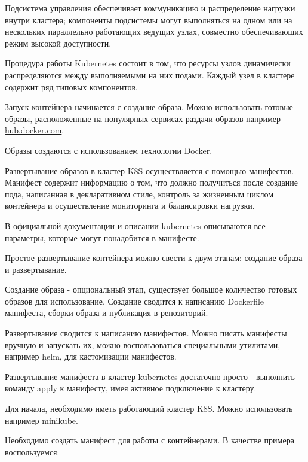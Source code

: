 Подсистема управления обеспечивает коммуникацию и распределение нагрузки внутри кластера; компоненты подсистемы могут выполняться на одном или на нескольких параллельно работающих ведущих узлах, совместно обеспечивающих режим высокой доступности.

Процедура работы Kubernetes состоит в том, что ресурсы узлов динамически распределяются между выполняемыми на них подами. Каждый узел в кластере содержит ряд типовых компонентов.


Запуск контейнера начинается с создание образа. Можно использовать готовые образы, расположенные на популярных сервисах раздачи образов например \href{https://hub.docker.com/}{hub.docker.com}. 

Образы создаются с использованием технологии Docker.

Развертывание образов в кластер K8S осуществляется с помощью манифестов. Манифест содержит информацию о том, что должно получиться после создание пода, написанная в декларативном стиле, контроль за жизненным циклом контейнера и осуществление мониторинга и балансировки нагрузки.

В официальной документации и описании kubernetes описываются все параметры, которые могут понадобится в манифесте.

Простое развертывание контейнера можно свести к двум этапам: создание образа и развертывание.

Создание образа - опциональный этап, существует большое количество готовых образов для использование. Создание сводится к написанию Dockerfile манифеста, сборки образа и публикация в репозиторий.

Развертывание сводится к написанию манифестов. Можно писать манифесты вручную и запускать их, можно воспользоваться специальными утилитами, например helm, для кастомизации манифестов.

Развертывание манифеста в кластер kubernetes достаточно просто - выполнить команду apply к манифесту, имея активное подключение к кластеру.


Для начала, необходимо иметь работающий кластер K8S. Можно использовать например minikube.

Необходимо создать манифест для работы с контейнерами. В качестве примера воспользуемся: 

